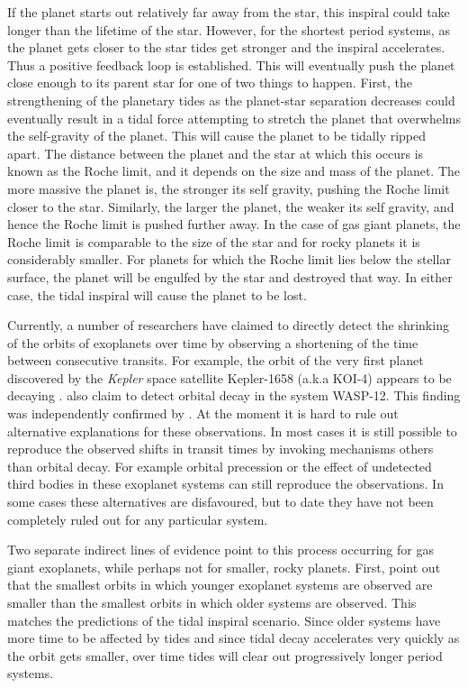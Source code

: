 If the planet starts out relatively far away from the star, this inspiral could
take longer than the lifetime of the star. However, for the shortest period
systems, as the planet gets closer to the star tides get stronger and the
inspiral accelerates. Thus a positive feedback loop is established. This will
eventually push the planet close enough to its parent star for one of two things
to happen. First, the strengthening of the planetary tides as the planet-star
separation decreases could eventually result in a tidal force attempting to
stretch the planet that overwhelms the self-gravity of the planet. This will
cause the planet to be tidally ripped apart. The distance between the planet and
the star at which this occurs is known as the Roche limit, and it depends on the
size and mass of the planet. The more massive the planet is, the stronger its
self gravity, pushing the Roche limit closer to the star.  Similarly, the larger
the planet, the weaker its self gravity, and hence the Roche limit is pushed
further away. In the case of gas giant planets, the Roche limit is comparable to
the size of the star and for rocky planets it is considerably smaller. For
planets for which the Roche limit lies below the stellar surface, the planet
will be engulfed by the star and destroyed that way. In either case, the tidal
inspiral will cause the planet to be lost.

Currently, a number of researchers have claimed to directly detect the shrinking
of the orbits of exoplanets over time by observing a shortening of the time
between consecutive transits. For example, the orbit of the very first planet
discovered by the \textit{Kepler} space satellite Kepler-1658 (a.k.a KOI-4)
appears to be decaying \citep{Vissapragada_et_al_22}.
\citet{Maciejewski_et_al_16} also claim to detect orbital decay in the system
WASP-12. This finding was independently confirmed by \citet{Patra_et_al_17}. At
the moment it is hard to rule out alternative explanations for these
observations. In most cases it is still possible to reproduce the observed
shifts in transit times by invoking mechanisms others than orbital decay. For
example orbital precession or the effect of undetected third bodies in these
exoplanet systems can still reproduce the observations. In some cases these
alternatives are disfavoured, but to date they have not been completely ruled
out for any particular system.

Two separate indirect lines of evidence point to this process occurring for gas
giant exoplanets, while perhaps not for smaller, rocky planets. First,
\citet{Jackson_et_al_09} point out that the smallest orbits in which younger
exoplanet systems are observed are smaller than the smallest orbits in which
older systems are observed. This matches the predictions of the tidal inspiral
scenario. Since older systems have more time to be affected by tides and since
tidal decay accelerates very quickly as the orbit gets smaller, over time tides
will clear out progressively longer period systems.

